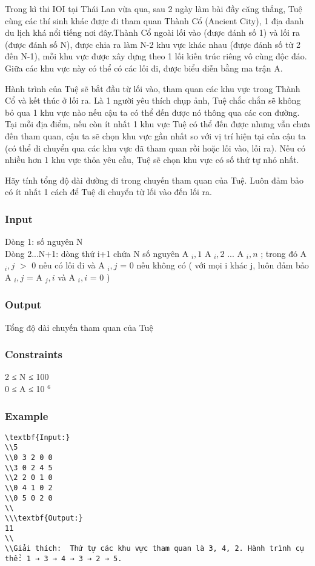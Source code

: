 



   Trong kì thi IOI tại Thái Lan vừa qua, sau 2 ngày làm bài đầy căng thẳng, Tuệ cùng các thí sinh khác được đi tham quan Thành Cổ (Ancient City), 1 địa danh du lịch khá nổi tiếng nơi đây.Thành Cổ ngoài lối vào (được đánh số 1) và lối ra (được đánh số N), được chia ra làm N-2 khu vực khác nhau (được đánh số từ 2 đến N-1), mỗi khu vực được xây dựng theo 1 lối kiến trúc riêng vô cùng độc đáo. Giữa các khu vực này có thể có các lối đi, được biểu diễn bằng ma trận A.  

   Hành trình của Tuệ sẽ bắt đầu từ lối vào, tham quan các khu vực trong Thành Cổ và kết thúc ở lối ra. Là 1 người yêu thích chụp ảnh, Tuệ chắc chắn sẽ không bỏ qua 1 khu vực nào nếu cậu ta có thể đến được nó thông qua các con đường. Tại mỗi địa điểm, nếu còn ít nhất 1 khu vực Tuệ có thể đến được nhưng vẫn chưa đến tham quan, cậu ta sẽ chọn khu vực gần nhất so với vị trí hiện tại của cậu ta (có thể di chuyển qua các khu vực đã tham quan rồi hoặc lối vào, lối ra). Nếu có nhiều hơn 1 khu vực thỏa yêu cầu, Tuệ sẽ chọn khu vực có số thứ tự nhỏ nhất.  

   Hãy tính tổng độ dài đường đi trong chuyến tham quan của Tuệ. Luôn đảm bảo có ít nhất 1 cách để Tuệ di chuyển từ lối vào đến lối ra.  

\subsubsection{   Input  }

   Dòng 1: số nguyên N   
\\   Dòng 2...N+1: dòng thứ i+1 chứa N số nguyên A   $_    i,1   $   A   $_    i,2   $   ... A   $_    i,n   $   ; trong đó A   $_    i,j   $   $>$ 0 nếu có lối đi và A   $_    i,j   $   = 0 nếu không có ( với mọi i khác j, luôn đảm bảo A   $_    i,j   $   = A   $_    j,i   $   và A   $_    i,i   $   = 0 )  

\subsubsection{   Output  }

   Tổng độ dài chuyến tham quan của Tuệ  

\subsubsection{   Constraints  }

   2 ≤ N ≤ 100   
\\   0 ≤ A ≤ 10   $^    6   $

\subsubsection{   Example  }
\begin{verbatim}
\textbf{Input:}
\\5
\\0 3 2 0 0
\\3 0 2 4 5
\\2 2 0 1 0
\\0 4 1 0 2
\\0 5 0 2 0
\\
\\\textbf{Output:}
11
\\
\\Giải thích:  Thứ tự các khu vực tham quan là 3, 4, 2. Hành trình cụ thể: 1 → 3 → 4 → 3 → 2 → 5.\end{verbatim}